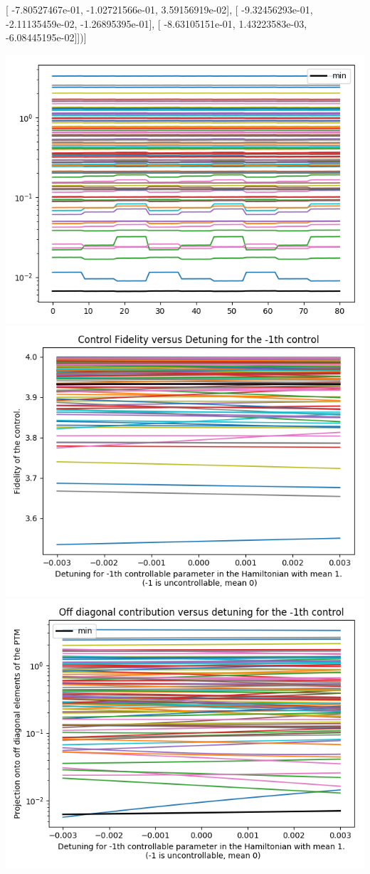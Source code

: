 \documentclass{article}
\begin{document}
       [ -7.80527467e-01,  -1.02721566e-01,   3.59156919e-02],
       [ -9.32456293e-01,  -2.11135459e-02,  -1.26895395e-01],
       [ -8.63105151e-01,   1.43223583e-03,  -6.08445195e-02]])]
\begin{center}
\includegraphics[scale=.9]{report_pickled_controls40/control_dpn_all}
\includegraphics[scale=.9]{control_fid_0}
\includegraphics[scale=.9]{off_diag_0}

\end{center}
\end{document}
